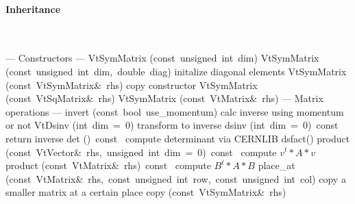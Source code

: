 \documentclass{article}
\begin{document}
\begin{cxxentry}
\begin{cxxclass}
\begin{cxxInheritance}
\paragraph{Inheritance}\strut\smallskip\strut\\
\end{cxxInheritance}
\begin{cxxpublic}
\cxxitem{}
        {--- Constructors --- }
        {}
        {}
        {}
\label{cxx.2.4.1}
\cxxitem{}
        {VtSymMatrix}
        {(const\ unsigned\ int\ dim)}
        {}
        {}
\label{cxx.2.4.2}
\cxxitem{}
        {VtSymMatrix}
        {(const\ unsigned\ int\ dim,\ double\ diag)}
        { initalize diagonal elements}
        {}
\label{cxx.2.4.3}
\cxxitem{}
        {VtSymMatrix}
        {(const\ VtSymMatrix\&\ rhs)}
        { copy constructor}
        {}
\label{cxx.2.4.4}
\cxxitem{}
        {VtSymMatrix}
        {(const\ VtSqMatrix\&\ rhs)}
        {}
        {}
\label{cxx.2.4.5}
\cxxitem{}
        {VtSymMatrix}
        {(const\ VtMatrix\&\ rhs)}
        {}
        {}
\label{cxx.2.4.6}
\cxxitem{}
        {--- Matrix operations --- }
        {}
        {}
        {}
\label{cxx.2.4.7}
        {invert}
        {(const\ bool\ use\_momentum)}
        { calc inverse using momentum or not}
        {}
\label{cxx.2.4.8}
        {VtDsinv}
        {(int\ dim\ =\ 0)}
        { transform to inverse}
        {}
\label{cxx.2.4.9}
        {dsinv}
        {(int\ dim\ =\ 0)\ const\ }
        { return inverse}
        {}
\label{cxx.2.4.10}
        {det}
        {()\ const\ }
        { compute determinant via CERNLIB dsfact()}
        {}
\label{cxx.2.4.11}
        {product}
        {(const\ VtVector\&\ rhs,\ unsigned\ int\ dim\ =\ 0)\ const\ }
        { compute $v^t*A*v$}
        {}
\label{cxx.2.4.12}
        {product}
        {(const\ VtMatrix\&\ rhs)\ const\ }
        { compute $B^t*A*B$}
        {}
\label{cxx.2.4.13}
        {place\_at}
        {(const\ VtMatrix\&\ rhs,\ const\ unsigned\ int\ row,\ const\ unsigned\ int\ col)}
        { copy a smaller matrix at a certain place}
        {}
\label{cxx.2.4.14}
        {copy}
        {(const\ VtSymMatrix\&\ rhs)}

\end{cxxpublic}
\end{cxxclass}
\end{cxxentry}
\end{document}
